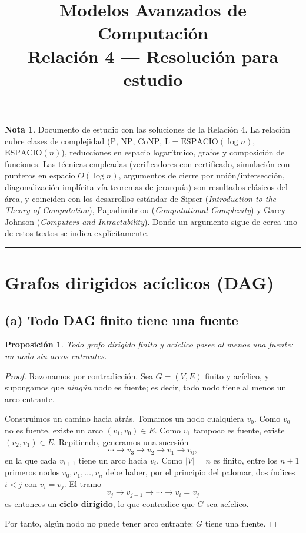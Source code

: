 \documentclass[11pt,a4paper]{article}
\title{\textbf{Modelos Avanzados de Computaci\'on}\\[2mm]
\large Relaci\'on 4 --- Resoluci\'on para estudio}
\author{}
\date{}
\theoremstyle{plain}
\newtheorem{proposicion}{Proposici\'on}
\theoremstyle{definition}
\newtheorem*{nota}{Nota}
\newcommand{\NP}{\mathrm{NP}}
\newcommand{\coNP}{\mathrm{CoNP}}
\newcommand{\Pclass}{\mathrm{P}}
\newcommand{\Lclass}{\mathrm{L}}
\newcommand{\SPACE}{\mathrm{ESPACIO}}
\begin{document}
\maketitle
\thispagestyle{fancy}

\begin{nota}
Documento de estudio con las soluciones de la Relaci\'on 4. La relaci\'on cubre
clases de complejidad ($\Pclass$, $\NP$, $\coNP$, $\Lclass=\SPACE(\log n)$,
$\SPACE(n)$), reducciones en espacio logar\'itmico, grafos y composici\'on de
funciones. Las t\'ecnicas empleadas (verificadores con certificado, simulaci\'on
con punteros en espacio $O(\log n)$, argumentos de cierre por uni\'on/intersecci\'on,
diagonalizaci\'on impl\'icita v\'ia teoremas de jerarqu\'ia) son resultados
cl\'asicos del \'area, y coinciden con los desarrollos est\'andar de Sipser
(\emph{Introduction to the Theory of Computation}), Papadimitriou
(\emph{Computational Complexity}) y Garey--Johnson (\emph{Computers and
Intractability}). Donde un argumento sigue de cerca uno de estos textos se
indica expl\'icitamente.
\end{nota}

\tableofcontents
\vspace{4mm}
\hrule
\vspace{4mm}

\section{Grafos dirigidos ac\'iclicos (DAG)}

\subsection*{(a) Todo DAG finito tiene una fuente}

\begin{proposicion}
Todo grafo dirigido finito y ac\'iclico posee al menos una \emph{fuente}: un nodo
sin arcos entrantes.
\end{proposicion}

\begin{proof}
Razonamos por contradicci\'on. Sea $G=(V,E)$ finito y ac\'iclico, y supongamos que
\emph{ning\'un} nodo es fuente; es decir, todo nodo tiene al menos un arco entrante.

Construimos un camino hacia atr\'as. Tomamos un nodo cualquiera $v_0$. Como $v_0$ no
es fuente, existe un arco $(v_1,v_0)\in E$. Como $v_1$ tampoco es fuente, existe
$(v_2,v_1)\in E$. Repitiendo, generamos una sucesi\'on
\[
\cdots \to v_3 \to v_2 \to v_1 \to v_0,
\]
en la que cada $v_{i+1}$ tiene un arco hacia $v_i$. Como $|V|=n$ es finito, entre
los $n+1$ primeros nodos $v_0,v_1,\dots,v_n$ debe haber, por el principio del
palomar, dos \'indices $i<j$ con $v_i=v_j$. El tramo
\[
v_j \to v_{j-1}\to \cdots \to v_i = v_j
\]
es entonces un \textbf{ciclo dirigido}, lo que contradice que $G$ sea ac\'iclico.

Por tanto, alg\'un nodo no puede tener arco entrante: $G$ tiene una fuente.
\end{proof}
\end{document}
